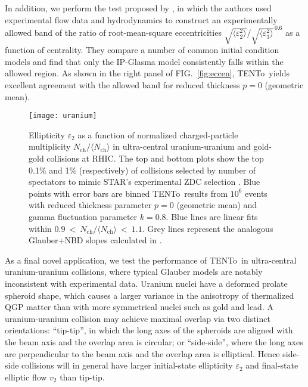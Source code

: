 \documentclass[aps,prc,reprint,amsmath,nofootinbib]{revtex4-1}
\newcommand{\trento}{T\raisebox{-.5ex}{R}ENTo}
\newcommand{\nch}{N_\text{ch}}
\newcommand{\eccratio}{\sqrt{\langle \varepsilon_2^2 \rangle}/\sqrt{\langle \varepsilon_3^2 \rangle}^{\,0.6}}
\begin{document}
In addition, we perform the test proposed by \cite{Retinskaya:2013gca}, in which the authors used experimental flow data
and hydrodynamics to construct an experimentally allowed band of the ratio of root-mean-square eccentricities $\eccratio$
as a function of centrality.  They compare a number of common initial condition models and find that only the IP-Glasma model consistently falls within the allowed region.
As shown in the right panel of FIG.~\ref{fig:eccen}, \trento\ yields excellent agreement with the allowed band for reduced thickness $p = 0$ (geometric mean).


\begin{figure}[b]
  \centering
  \texttt{[image: uranium]}
  \caption{
    \label{fig:uranium}
    Ellipticity $\varepsilon_2$ as a function of normalized charged-particle multiplicity
    $\nch/\langle\nch\rangle$ in ultra-central uranium-uranium and gold-gold collisions at RHIC.  The top and
    bottom plots show the top 0.1\% and 1\% (respectively) of collisions selected by number of spectators to
    mimic STAR's experimental ZDC selection \cite{FortheSTAR:2013bza}.  Blue points with error bars are binned
    \protect\trento\ results from $10^6$ events with reduced thickness parameter $p = 0$ (geometric mean) and
    gamma fluctuation parameter $k = 0.8$.  Blue lines are linear fits within
    $0.9~<~\nch/\langle\nch\rangle~<~1.1$.  Grey lines represent the analogous Glauber+NBD slopes calculated
    in \cite{FortheSTAR:2013bza}.
  }
\end{figure}

As a final novel application, we test the performance of \trento\ in ultra-central uranium-uranium collisions, where typical Glauber models are notably inconsistent with experimental data.
Uranium nuclei have a deformed prolate spheroid shape, which causes a larger variance in the anisotropy of thermalized QGP matter than with more symmetrical nuclei such as gold and lead.
A uranium-uranium collision may achieve maximal overlap via two distinct orientations:
``tip-tip'', in which the long axes of the spheroids are aligned with the beam axis and the overlap area is circular;
or ``side-side'', where the long axes are perpendicular to the beam axis and the overlap area is elliptical.
Hence side-side collisions will in general have larger initial-state ellipticity $\varepsilon_2$ and final-state elliptic flow $v_2$ than tip-tip.
\end{document}
